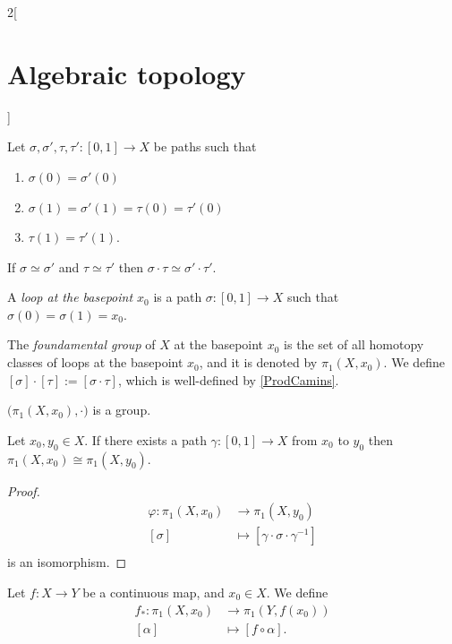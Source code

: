 \documentclass[../../../main_math.tex]{subfiles}
\begin{document}
\begin{multicols}{2}[\section{Algebraic topology}]
\begin{definition}
	\end{definition}

	\begin{lemma}\label{ProdCamins}
		Let $\sigma, \sigma', \tau, \tau':[0,1]\to X$ be paths such that 
		\begin{enumerate}
			\item $\sigma(0)=\sigma'(0)$
			\item $\sigma(1)=\sigma'(1)=\tau(0)=\tau'(0)$
			\item $\tau(1)=\tau'(1)$.
		\end{enumerate}
		If $\sigma \simeq \sigma'$ and $\tau \simeq \tau'$ then $\sigma \cdot \tau \simeq \sigma' \cdot \tau'$.
	\end{lemma}

	
	\begin{definition}
		A \emph{loop at the basepoint $x_0$} is a path $\sigma: [0,1]\to X$ such that $\sigma(0)=\sigma(1)=x_0$.
	\end{definition}

	\begin{definition}
		The \emph{foundamental group} of $X$ at the basepoint $x_0$ is the set of all homotopy classes of loops at the basepoint $x_0$, and it is denoted by $\pi_1 (X,x_0)$. We define $[\sigma]\cdot [\tau]:=[\sigma \cdot \tau]$, which is well-defined by \cref{ProdCamins}.
	\end{definition}

	\begin{proposition}
		$\big(\pi_1(X,x_0), \cdot \big)$ is a group.
	\end{proposition}
	
	\begin{proposition}
		Let $x_0, y_0 \in X$. If there exists a path $\gamma: [0,1] \to X$ from $x_0$ to $y_0$ then $\pi_1 (X,x_0) \cong \pi_1 (X,y_0)$.
	\end{proposition}
	
	\begin{proof}
		\begin{align*}
			\varphi: \pi_1(X,x_0) &\longrightarrow \pi_1(X,y_0) \\
			[\sigma]&\longmapsto [\gamma \cdot \sigma \cdot \gamma^{-1}]\\
		\end{align*}
		is an isomorphism.
	\end{proof}
	
	\begin{definition}
		Let $f:X\to Y$ be a continuous map, and $x_0 \in X$. We define 
		\begin{align*}
			f_*: \pi_1 (X,x_0) & \longrightarrow \pi_1 (Y,f(x_0)) \\
			[\alpha] &\longmapsto [f\circ \alpha].
		\end{align*}
		

\end{definition}
\end{multicols}
\end{document}
